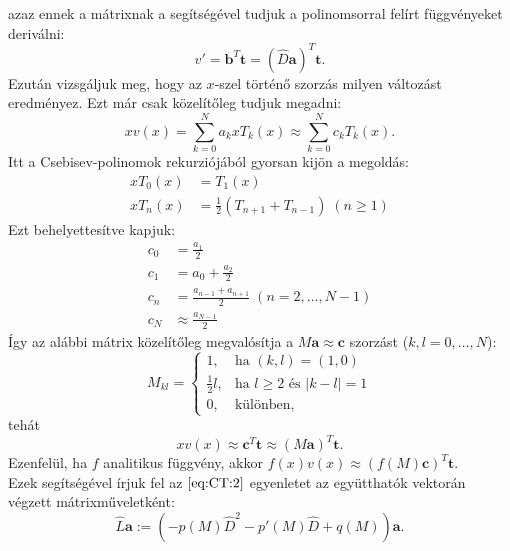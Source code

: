 \documentclass[oneside, titlepage, 12pt, a4paper]{report}
\begin{document}
azaz ennek a mátrixnak a segítségével tudjuk a polinomsorral felírt függvényeket deriválni:
\begin{equation*}
v' = \mathbf{b}^T \mathbf{t} = (\hat{D}\mathbf{a})^T \mathbf{t}.
\end{equation*}
Ezután vizsgáljuk meg, hogy az $x$-szel történő szorzás milyen változást eredményez. Ezt már csak közelítőleg tudjuk megadni:
\begin{equation*}
x v(x) = \sum_{k = 0}^N a_k x T_k(x) \approx \sum_{k = 0}^N c_k T_k(x).
\end{equation*}
Itt a Csebisev-polinomok rekurziójából gyorsan kijön a megoldás:
\begin{align*}
x T_0(x) &= T_1(x) \\
x T_n(x) &= \frac{1}{2} \left( T_{n+1} + T_{n-1} \right) \; (n \geq 1)
\end{align*}
Ezt behelyettesítve kapjuk:
\begin{align*}
c_0 &= \frac{a_1}{2} \\
c_1 &= a_0 + \frac{a_2}{2} \\
c_n &= \frac{a_{n-1} + a_{n+1}}{2} \; (n = 2, \dots, N-1) \\
c_N &\approx \frac{a_{N-1}}{2}
\end{align*}
Így az alábbi mátrix közelítőleg megvalósítja a $M \mathbf{a} \approx \mathbf{c}$ szorzást ($k, l = 0, \dots, N$):
\begin{equation*}
M_{kl} =
	\begin{cases}
	1, &\text{ha }(k, l) = (1, 0) \\
	\frac{1}{2}l, &\text{ha } l \geq 2 \text{ és } |k - l| = 1 \\
	0, &\text{különben},
	\end{cases}
\end{equation*}
tehát
\begin{equation*}
x v(x) \approx \mathbf{c}^T \mathbf{t} \approx (M \mathbf{a})^T \mathbf{t}.
\end{equation*}
Ezenfelül, ha $f$ analitikus függvény, akkor $f(x) v(x) \approx (f(M)\mathbf{c})^T \mathbf{t}$. \\ %
Ezek segítségével írjuk fel az $\eqref{eq:CT:2}$ egyenletet az együtthatók vektorán végzett mátrixműveletként:
\begin{equation*}
\hat{L} \mathbf{a} := \left( -p(M) \hat{D}^2 - p'(M) \hat{D} + q(M) \right) \mathbf{a}.
\end{equation*}
\end{document}
